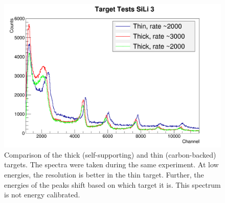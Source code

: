 \begin{figure}
    \centering
    \includegraphics[scale=0.3]{Future_Figs/SiLi3.png}
    \caption{Comparison of the thick (self-supporting) and thin (carbon-backed) targets. The spectra were taken during the same experiment. At low energies, the resolution is better in the thin target. Further, the energies of the peaks shift based on which target it is. This spectrum is not energy calibrated.}
    \label{fig:target_test}
\end{figure}